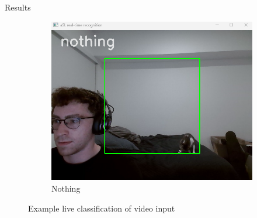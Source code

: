 \documentclass[12pt, a4paper]{article}
\begin{document}
\begin{section}{Results}
\begin{figure}[H]
        \hfill
        \begin{subfigure}[b]{0.45\textwidth}
            \centering
            \includegraphics[width=\textwidth]{../plots/real_time_sample2.png}
            \caption{Nothing}
            \label{fig:nothing}
        \end{subfigure}
        \caption{Example live classification of video input}
        \label{fig:live_video_samples}
    \end{figure}
\end{section}
\end{document}
